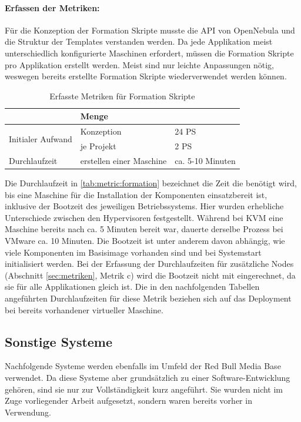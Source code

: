 \paragraph{Erfassen der Metriken:}
Für die Konzeption der Formation Skripte musste die API von OpenNebula und die Struktur der Templates verstanden werden. Da jede Applikation meist unterschiedlich konfigurierte Maschinen erfordert, müssen die Formation Skripte pro Applikation erstellt werden. Meist sind nur leichte Anpassungen nötig, weswegen bereits erstellte Formation Skripte wiederverwendet werden können.

\begin{table}[ht]
\setlength{\tabcolsep}{5pt}
\renewcommand{\arraystretch}{1.5}
\centering
\begin{tabular}{|l|l|l|}
\hline
\rowcolor[HTML]{C0C0C0}
\multicolumn{2}{|c|}{\textbf{Metrik}} 		& \textbf{Menge}		\\ 
\hline
\multirow{2}{*}{Initialer Aufwand}			& Konzeption		& 24 PS	\\ 
\cline{2-3}
											& je Projekt 	& 2 PS	\\
\hline
Durchlaufzeit				& erstellen einer Maschine  & ca. 5-10 Minuten \\ 
\hline
\end{tabular}
\caption{Erfasste Metriken für Formation Skripte}
\label{tab:metric:formation}
\end{table}

Die Durchlaufzeit in \autoref{tab:metric:formation} bezeichnet die Zeit die benötigt wird, bis eine Maschine für die Installation der Komponenten einsatzbereit ist, inklusive der Bootzeit des jeweiligen Betriebssystems. Hier wurden erhebliche Unterschiede zwischen den Hypervisoren festgestellt. Während bei KVM eine Maschine bereits nach ca. 5 Minuten bereit war, dauerte derselbe Prozess bei VMware ca. 10 Minuten. Die Bootzeit ist unter anderem davon abhängig, wie viele Komponenten im Basisimage vorhanden sind und bei Systemstart initialisiert werden. Bei der Erfassung der Durchlaufzeiten für zusätzliche Nodes (Abschnitt \ref{sec:metriken}, Metrik c) wird die Bootzeit nicht mit eingerechnet, da sie für alle Applikationen gleich ist. Die in den nachfolgenden Tabellen angeführten Durchlaufzeiten für diese Metrik beziehen sich auf das Deployment bei bereits vorhandener virtueller Maschine.

\subsection{Sonstige Systeme}
\label{sec:tools:sonstige}
Nachfolgende Systeme werden ebenfalls im Umfeld der Red Bull Media Base verwendet. Da diese Systeme aber grundsätzlich zu einer Software-Entwicklung gehören, sind sie nur zur Vollständigkeit kurz angeführt. Sie wurden nicht im Zuge vorliegender Arbeit aufgesetzt, sondern waren bereits vorher in Verwendung.

